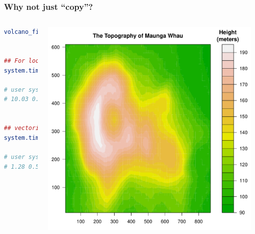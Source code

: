 \documentclass{beamer}
\begin{document}
\begin{frame}[fragile]
\frametitle{Why not just ``copy''?}

\begin{columns}[c]
\begin{lstlisting}[language = R]
volcano_filled.contour()


## For loop 
system.time(grid.echo())

# user system elapsed
# 10.03 0.23 10.32


## vectorization
system.time(grid.echo())

# user system elapsed
# 1.28 0.53 1.82
\end{lstlisting}

\begin{center}
\includegraphics{plot/filled_example_1}
\end{center}

\end{columns}
\end{frame}



\end{document}
